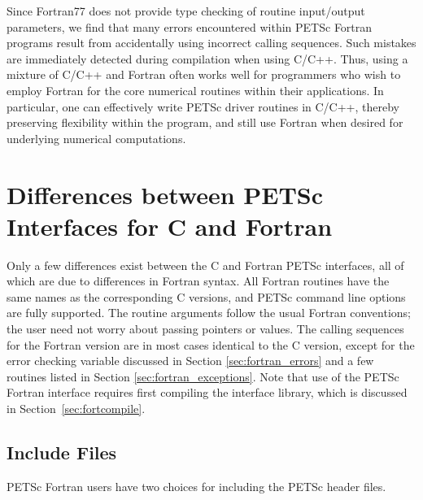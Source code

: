 Since Fortran77 does not provide type checking of routine input/output
parameters, we find that many errors encountered within PETSc Fortran
programs result from accidentally using incorrect calling sequences.
Such mistakes are immediately detected during compilation when using
C/C++.  Thus, using a mixture of C/C++ and Fortran often works well
for programmers who wish to employ Fortran for the core numerical
routines within their applications.  In particular, one can
effectively write PETSc driver routines in C/C++, thereby preserving
flexibility within the program, and still use Fortran when desired for
underlying numerical computations.

\section{Differences between PETSc Interfaces for C and Fortran}

Only a few differences exist between the C and Fortran PETSc
interfaces, all of which are due to differences in Fortran syntax.
All Fortran routines have the same names as the corresponding C
versions, and PETSc command line options are fully supported. The
routine arguments follow the usual Fortran conventions; the user need
not worry about passing pointers or values.  The calling sequences
for the Fortran version are in most cases identical to the C version,
except for the error checking variable discussed in 
Section \ref{sec:fortran_errors} and a few routines listed in 
Section \ref{sec:fortran_exceptions}.
Note that use of the PETSc Fortran interface requires first compiling
the interface library, which is discussed in Section~\ref{sec:fortcompile}.

\subsection{Include Files}
\label{sec:fortran_includes}

PETSc Fortran users have two choices for including the PETSc header 
files. 

\medskip

